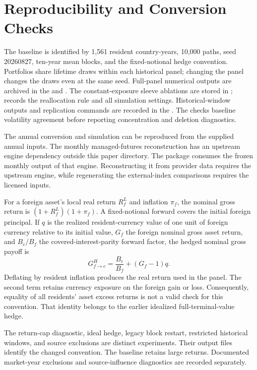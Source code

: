 \section{Reproducibility and Conversion Checks}
\label{app:reproducibility}
The baseline is identified by 1,561 resident country-years,
10,000 paths, seed 20260827, ten-year mean blocks, and the
fixed-notional hedge convention. Portfolios share lifetime draws within each historical panel; changing
the panel changes the draws even at the same seed. Full-panel numerical outputs are archived in the
 and
.
The constant-exposure sleeve ablations are stored in
;
 records the
reallocation rule and all simulation settings.
Historical-window outputs and replication commands are recorded in the
. The
 checks baseline volatility agreement
before reporting concentration and deletion diagnostics.

The annual conversion and simulation can be reproduced from the supplied
annual inputs. The monthly managed-futures reconstruction has an upstream
engine dependency outside this paper directory. The package consumes the frozen monthly output of that engine.
Reconstructing it from provider data requires the upstream engine, while
regenerating the external-index comparisons requires the licensed inputs.

For a foreign asset's local real return $R^L_f$ and inflation $\pi_f$,
the nominal gross return is $(1+R^L_f)(1+\pi_f)$. A fixed-notional
forward covers the initial foreign principal. If $q$ is the realized
resident-currency value of one unit of foreign currency relative to its
initial value, $G_f$ the foreign nominal gross asset return, and
$B_c/B_f$ the covered-interest-parity forward factor, the hedged nominal
gross payoff is
\[
 G^{H}_{f\to c}=\frac{B_c}{B_f}+(G_f-1)q.
\]
Deflating by resident inflation produces the real return used in the
panel. The second term retains currency exposure on the foreign
gain or loss. Consequently, equality of all residents' asset excess
returns is not a valid check for this convention. That identity belongs
to the earlier idealized full-terminal-value hedge.

The return-cap diagnostic, ideal hedge, legacy block restart, restricted
historical windows, and source exclusions are distinct experiments.
Their output files identify the changed convention.
The baseline retains large returns. Documented market-year exclusions and
source-influence diagnostics are recorded separately.

